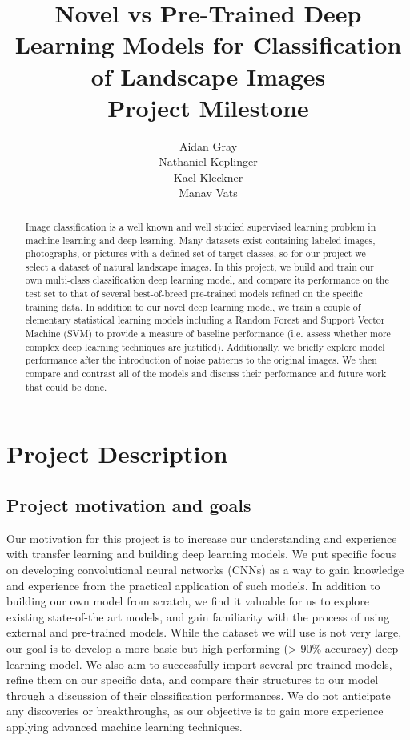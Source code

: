 \documentclass{article}
\title{Novel vs Pre-Trained Deep Learning Models for Classification of Landscape Images\\
\large Project Milestone
}
\author{%
Aidan Gray\\
\And
Nathaniel Keplinger \\
\And
Kael Kleckner \\
\And
Manav Vats \\
  }
\begin{document}
\maketitle

\begin{abstract}
    Image classification is a well known and well studied supervised learning problem in machine learning and deep learning. Many datasets exist containing labeled images, photographs, or pictures with a defined set of target classes, so for our project we select a dataset of natural landscape images. In this project, we build and train our own multi-class classification deep learning model, and compare its performance on the test set to that of several best-of-breed pre-trained models refined on the specific training data. In addition to our novel deep learning model, we train a couple of elementary statistical learning models including a Random Forest and Support Vector Machine (SVM) to provide a measure of baseline performance (i.e. assess whether more complex deep learning techniques are justified). Additionally, we briefly explore model performance after the introduction of noise patterns to the original images. We then compare and contrast all of the models and discuss their performance and future work that could be done.
\end{abstract}

\section{Project Description}
\subsection{Project motivation and goals}
Our motivation for this project is to increase our understanding and experience with transfer learning and building deep learning models. We put specific focus on developing convolutional neural networks (CNNs) as a way to gain knowledge and experience from the practical application of such models. In addition to building our own model from scratch, we find it valuable for us to explore existing state-of-the art models, and gain familiarity with the process of using external and pre-trained models. While the dataset we will use is not very large, our goal is to develop a more basic but high-performing (> 90\% accuracy) deep learning model. We also aim to successfully import several pre-trained models, refine them on our specific data, and compare their structures to our model through a discussion of their classification performances. We do not anticipate any discoveries or breakthroughs, as our objective is to gain more experience applying advanced machine learning techniques.
\end{document}
